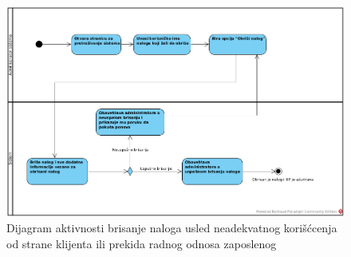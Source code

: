 \begin{figure}[H]
\begin{center}
\includegraphics[width=\textwidth]{Pictures/activity_user_delete.png}
\end{center}
    \caption{Dijagram aktivnosti brisanje naloga usled neadekvatnog korišćcenja od strane klijenta ili prekida radnog odnosa zaposlenog}
\label{fig:ActivityDeleteUserAccount}
\end{figure}
